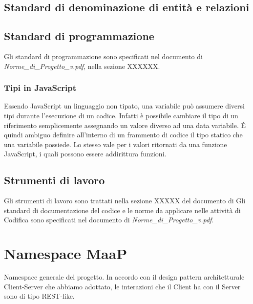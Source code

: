 \subsection{Standard di denominazione di entità e relazioni}

\subsection{Standard di programmazione}
Gli standard di programmazione sono specificati nel documento di 
\emph{Norme\_{}di\_{}Progetto\_{}v\versioneNormeDiProgetto{}.pdf}, nella sezione XXXXXX.	%
\subsubsection{Tipi in JavaScript}
Essendo JavaScript un linguaggio non tipato, una variabile può assumere diversi tipi durante l'esecuzione
di un codice. Infatti è possibile cambiare il tipo di un riferimento semplicemente assegnando un valore diverso ad
una data variabile. \'{E} quindi ambiguo definire all'interno di un frammento di codice il tipo statico che una variabile
possiede. Lo stesso vale per i valori ritornati da una funzione JavaScript, i quali possono essere addirittura funzioni.







\subsection{Strumenti di lavoro}
Gli strumenti di lavoro sono trattati nella sezione XXXXX del documento di					%
Gli standard di documentazione del codice e le norme da applicare nelle attività 
di Codifica sono specificati nel documento di 
\emph{Norme\_{}di\_{}Progetto\_{}v\versioneNormeDiProgetto{}.pdf}.


\newpage

\section{Namespace MaaP}
Namespace generale del progetto. In accordo con il design pattern architetturale Client-Server che 
abbiamo adottato, le interazioni che il Client ha con il Server sono di tipo REST-like.

